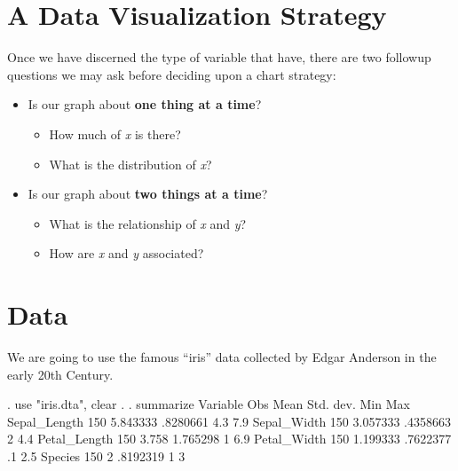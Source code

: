\documentclass[
]{article}
\providecommand{\tightlist}{%
  \setlength{\itemsep}{0pt}\setlength{\parskip}{0pt}}
\begin{document}
\hypertarget{a-data-visualization-strategy}{%
\section{A Data Visualization
Strategy}\label{a-data-visualization-strategy}}

Once we have discerned the type of variable that have, there are two
followup questions we may ask before deciding upon a chart strategy:

\begin{itemize}
\tightlist
\item
  Is our graph about \textbf{one thing at a time}?

  \begin{itemize}
  \tightlist
  \item
    How much of \emph{x} is there?
  \item
    What is the distribution of \emph{x}?
  \end{itemize}
\item
  Is our graph about \textbf{two things at a time}?

  \begin{itemize}
  \tightlist
  \item
    What is the relationship of \emph{x} and \emph{y}?
  \item
    How are \emph{x} and \emph{y} associated?
  \end{itemize}
\end{itemize}

\hypertarget{data}{%
\section{Data}\label{data}}

We are going to use the famous ``iris'' data collected by Edgar Anderson
in the early 20th Century.

\begin{stlog}
. use "iris.dta", clear
{\smallskip}
. 
. summarize
{\smallskip}
    Variable {\VBAR}        Obs        Mean    Std. dev.       Min        Max
Sepal_Length {\VBAR}        150    5.843333    .8280661        4.3        7.9
 Sepal_Width {\VBAR}        150    3.057333    .4358663          2        4.4
Petal_Length {\VBAR}        150       3.758    1.765298          1        6.9
 Petal_Width {\VBAR}        150    1.199333    .7622377         .1        2.5
     Species {\VBAR}        150           2    .8192319          1          3
\end{stlog}
\end{document}
